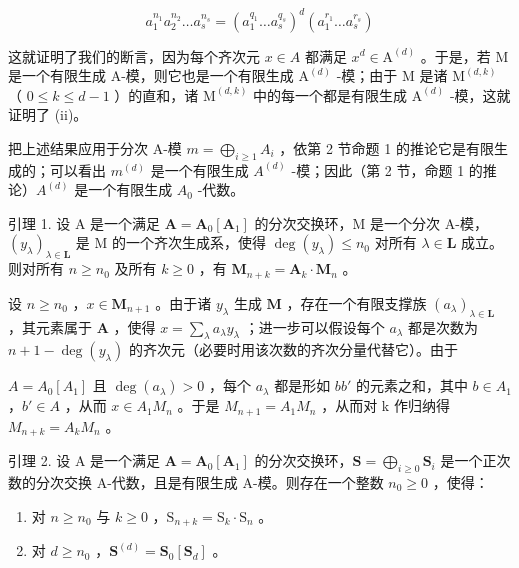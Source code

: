 \[
a _ {1} ^ {n _ {1}} a _ {2} ^ {n _ {2}} \dots a _ {s} ^ {n _ {s}} = (a _ {1} ^ {q _ {1}} \dots a _ {s} ^ {q _ {s}}) ^ {d} (a _ {1} ^ {r _ {1}} \dots a _ {s} ^ {r _ {s}})
\]

这就证明了我们的断言，因为每个齐次元 \(x \in A\) 都满足 \(x^{d} \in \mathrm{A}^{(d)}\) 。于是，若 M 是一个有限生成 A-模，则它也是一个有限生成 \(\mathrm{A}^{(d)}\) -模；由于 M 是诸 \(\mathrm{M}^{(d,k)}\) （ \(0 \leqslant k \leqslant d - 1\) ）的直和，诸 \(\mathrm{M}^{(d,k)}\) 中的每一个都是有限生成 \(\mathrm{A}^{(d)}\) -模，这就证明了 (ii)。

把上述结果应用于分次 A-模 \(m = \bigoplus_{i \geqslant 1} A_i\) ，依第 2 节命题 1 的推论它是有限生成的；可以看出 \(m^{(d)}\) 是一个有限生成 \(A^{(d)}\) -模；因此（第 2 节，命题 1 的推论）\(A^{(d)}\) 是一个有限生成 \(A_0\) -代数。

引理 1. 设 A 是一个满足 \(\mathbf{A} = \mathbf{A}_0[\mathbf{A}_1]\) 的分次交换环，M 是一个分次 A-模，\((y_{\lambda})_{\lambda \in \mathbf{L}}\) 是 M 的一个齐次生成系，使得 \(\deg(y_{\lambda}) \leqslant n_0\) 对所有 \(\lambda \in \mathbf{L}\) 成立。则对所有 \(n \geqslant n_0\) 及所有 \(k \geqslant 0\) ，有 \(\mathbf{M}_{n+k} = \mathbf{A}_k \cdot \mathbf{M}_n\) 。

设 \(n \geqslant n_0\) ，\(x \in \mathbf{M}_{n+1}\) 。由于诸 \(y_\lambda\) 生成 \(\mathbf{M}\) ，存在一个有限支撑族 \((a_\lambda)_{\lambda \in \mathbf{L}}\) ，其元素属于 \(\mathbf{A}\) ，使得 \(x = \sum_{\lambda} a_\lambda y_\lambda\) ；进一步可以假设每个 \(a_\lambda\) 都是次数为 \(n + 1 - \deg(y_\lambda)\) 的齐次元（必要时用该次数的齐次分量代替它）。由于

\(A = A_{0}[A_{1}]\) 且 \(\deg(a_{\lambda}) > 0\) ，每个 \(a_{\lambda}\) 都是形如 \(bb'\) 的元素之和，其中 \(b \in A_{1}\) ，\(b' \in A\) ，从而 \(x \in A_{1}M_{n}\) 。于是 \(M_{n+1} = A_{1}M_{n}\) ，从而对 k 作归纳得 \(M_{n+k} = A_{k}M_{n}\) 。

引理 2. 设 A 是一个满足 \(\mathbf{A} = \mathbf{A}_0[\mathbf{A}_1]\) 的分次交换环，\(\mathbf{S} = \bigoplus_{i\geqslant 0}\mathbf{S}_i\) 是一个正次数的分次交换 A-代数，且是有限生成 A-模。则存在一个整数 \(n_0\geqslant 0\) ，使得：

\begin{enumerate}
\def\labelenumi{(\roman{enumi})}
\item
  对 \(n \geqslant n_0\) 与 \(k \geqslant 0\) ，\(\mathrm{S}_{n+k} = \mathrm{S}_k \cdot \mathrm{S}_n\) 。
\item
  对 \(d \geqslant n_0\) ，\(\mathbf{S}^{(d)} = \mathbf{S}_0[\mathbf{S}_d]\) 。
\end{enumerate}

